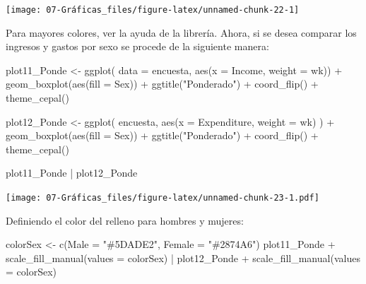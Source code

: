 \documentclass[
  12pt,
]{book}
\newenvironment{Shaded}{\begin{snugshade}}{\end{snugshade}}
\newcommand{\AttributeTok}[1]{\textcolor[rgb]{0.77,0.63,0.00}{#1}}
\newcommand{\FunctionTok}[1]{\textcolor[rgb]{0.00,0.00,0.00}{#1}}
\newcommand{\NormalTok}[1]{#1}
\newcommand{\OtherTok}[1]{\textcolor[rgb]{0.56,0.35,0.01}{#1}}
\newcommand{\SpecialCharTok}[1]{\textcolor[rgb]{0.00,0.00,0.00}{#1}}
\newcommand{\StringTok}[1]{\textcolor[rgb]{0.31,0.60,0.02}{#1}}
\begin{document}
\begin{center}\texttt{[image: 07-Gráficas\_files/figure-latex/unnamed-chunk-22-1]} \end{center}

Para mayores colores, ver la ayuda de la librería. Ahora, si se desea comparar los ingresos y gastos por sexo se procede de la siguiente manera:

\begin{Shaded}
\begin{Highlighting}[]
\NormalTok{plot11\_Ponde }\OtherTok{\textless{}{-}} \FunctionTok{ggplot}\NormalTok{(}
  \AttributeTok{data =}\NormalTok{ encuesta,}
  \FunctionTok{aes}\NormalTok{(}\AttributeTok{x =}\NormalTok{ Income, }\AttributeTok{weight =}\NormalTok{ wk)) }\SpecialCharTok{+}
  \FunctionTok{geom\_boxplot}\NormalTok{(}\FunctionTok{aes}\NormalTok{(}\AttributeTok{fill =}\NormalTok{ Sex)) }\SpecialCharTok{+}
  \FunctionTok{ggtitle}\NormalTok{(}\StringTok{"Ponderado"}\NormalTok{) }\SpecialCharTok{+}
  \FunctionTok{coord\_flip}\NormalTok{() }\SpecialCharTok{+}
  \FunctionTok{theme\_cepal}\NormalTok{()}

\NormalTok{plot12\_Ponde }\OtherTok{\textless{}{-}} \FunctionTok{ggplot}\NormalTok{(}
\NormalTok{  encuesta,}
  \FunctionTok{aes}\NormalTok{(}\AttributeTok{x =}\NormalTok{ Expenditure, }\AttributeTok{weight =}\NormalTok{ wk)}
\NormalTok{) }\SpecialCharTok{+}
  \FunctionTok{geom\_boxplot}\NormalTok{(}\FunctionTok{aes}\NormalTok{(}\AttributeTok{fill =}\NormalTok{ Sex)) }\SpecialCharTok{+}
  \FunctionTok{ggtitle}\NormalTok{(}\StringTok{"Ponderado"}\NormalTok{) }\SpecialCharTok{+}
  \FunctionTok{coord\_flip}\NormalTok{() }\SpecialCharTok{+}
  \FunctionTok{theme\_cepal}\NormalTok{()}

\NormalTok{plot11\_Ponde }\SpecialCharTok{|}\NormalTok{ plot12\_Ponde}
\end{Highlighting}
\end{Shaded}

\texttt{[image: 07-Gráficas\_files/figure-latex/unnamed-chunk-23-1.pdf]}

Definiendo el color del relleno para hombres y mujeres:

\begin{Shaded}
\begin{Highlighting}[]
\NormalTok{colorSex }\OtherTok{\textless{}{-}} \FunctionTok{c}\NormalTok{(}\AttributeTok{Male =} \StringTok{"\#5DADE2"}\NormalTok{, }\AttributeTok{Female =} \StringTok{"\#2874A6"}\NormalTok{)}
\NormalTok{plot11\_Ponde }\SpecialCharTok{+} \FunctionTok{scale\_fill\_manual}\NormalTok{(}\AttributeTok{values =}\NormalTok{ colorSex) }\SpecialCharTok{|}
\NormalTok{  plot12\_Ponde }\SpecialCharTok{+} \FunctionTok{scale\_fill\_manual}\NormalTok{(}\AttributeTok{values =}\NormalTok{ colorSex)}
\end{Highlighting}
\end{Shaded}
\end{document}
